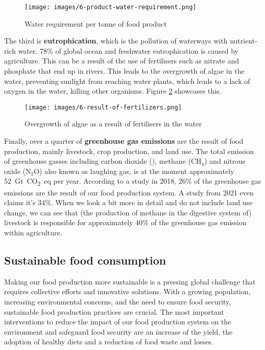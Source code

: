 \documentclass[../summary.tex]{subfiles}
\begin{document}
\begin{figure}[htbp]
	\centering
	\texttt{[image: images/6-product-water-requirement.png]}
	\caption{Water requirement per tonne of food product}
	\label{fig:production-water-requirement}
\end{figure}

The third is \textbf{eutrophication}, which is the pollution of waterways with nutrient-rich water. 78\% of global ocean and freshwater eutrophication is caused by agriculture. This can be a result of the use of fertilisers such as nitrate and phosphate that end up in rivers. This leads to the overgrowth of algae in the water, preventing sunlight from reaching water plants, which leads to a lack of oxygen in the water, killing other organisms. Figure \ref{fig:result-of-fertilisers} showcases this.
\\
\begin{figure}[htbp]
	\centering
	\texttt{[image: images/6-result-of-fertilizers.png]}
	\caption{Overgrowth of algae as a result of fertilisers in the water}
	\label{fig:result-of-fertilisers}
\end{figure}


Finally, over a quarter of \textbf{greenhouse gas emissions} are the result of food production, mainly livestock, crop production, and land use. The total emission of greenhouse gasses including carbon dioxide (\COtwo), methane ($\mathrm{CH_{4}}$) and nitrous oxide ($\mathrm{N_{2}{O}}$) also known as laughing gas, is at the moment approximately \SI{52}{\giga\tonne CO_2 eq} per year. According to a study in 2018, 26\% of the greenhouse gas emissions are the result of our food production system. A study from 2021 even claims it's 34\%. When we look a bit more in detail and do not include land use change, we can see that (the production of methane in the digestive system of) livestock is responsible for approximately 40\% of the greenhouse gas emission within agriculture.

\subsection{Sustainable food consumption}

Making our food production more sustainable is a pressing global challenge that requires collective efforts and innovative solutions. With a growing population, increasing environmental concerns, and the need to ensure food security, sustainable food production practices are crucial. The most important interventions to reduce the impact of our food production system on the environment and safeguard food security are an increase of the yield, the adoption of healthy diets and a reduction of food waste and losses.
\end{document}
